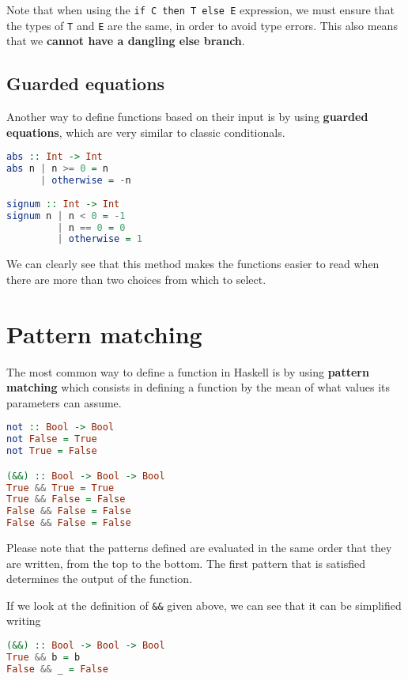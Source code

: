 Note that when using the \texttt{if C then T else E} expression, we must ensure that the types of \texttt{T} and \texttt{E} are the same, in order to avoid type errors. This also means that we \textbf{cannot have a dangling else branch}. 

\subsection{Guarded equations}
Another way to define functions based on their input is by using \textbf{guarded equations}, which are very similar to classic conditionals.

\begin{lstlisting}[language=haskell]
abs :: Int -> Int
abs n | n >= 0 = n
	  | otherwise = -n
	  
signum :: Int -> Int
signum n | n < 0 = -1
		 | n == 0 = 0
		 | otherwise = 1
\end{lstlisting}

We can clearly see that this method makes the functions easier to read when there are more than two choices from which to select. 


\section{Pattern matching}
The most common way to define a function in Haskell is by using \textbf{pattern matching} which consists in defining a function by the mean of what values its parameters can assume. 

\begin{lstlisting}[language=haskell]
not :: Bool -> Bool
not False = True
not True = False

(&&) :: Bool -> Bool -> Bool
True && True = True
True && False = False
False && False = False
False && False = False
\end{lstlisting}

Please note that the patterns defined are evaluated in the same order that they are written, from the top to the bottom. The first pattern that is satisfied determines the output of the function.
\linebreak \linebreak

If we look at the definition of \texttt{\&\&} given above, we can see that it can be simplified writing

\begin{lstlisting}[language=haskell]
(&&) :: Bool -> Bool -> Bool
True && b = b
False && _ = False
\end{lstlisting}

